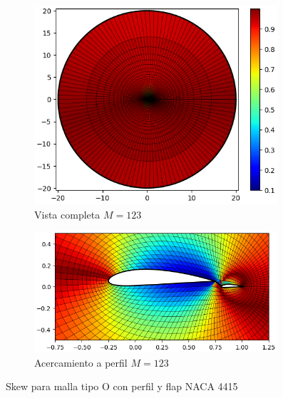 \documentclass[letterpaper, openright, 12pt]{book}
\begin{document}
\begin{figure}[htbp!]
\begin{subfigure}[c]{0.48\textwidth}
            \includegraphics[keepaspectratio, width=0.99\textwidth]
                {./img/naca4415_flap_m_123_skew_far}
            \caption{Vista completa $M = 123$}
            \label{fig:naca4415_flap_m_123_skew_far}
        \end{subfigure}
        \hfill
        \begin{subfigure}[c]{0.48\textwidth}
            \includegraphics[keepaspectratio, width=0.99\textwidth]
                {./img/naca4415_flap_m_123_skew_close}
            \caption{Acercamiento a perfil $M = 123$}
            \label{fig:naca4415_flap_m_123_skew_close}
        \end{subfigure}
        \caption{Skew para malla tipo O con perfil y flap NACA 4415}
        \label{fig:naca4415_flap_skew_0}
    \end{figure}
\end{document}
